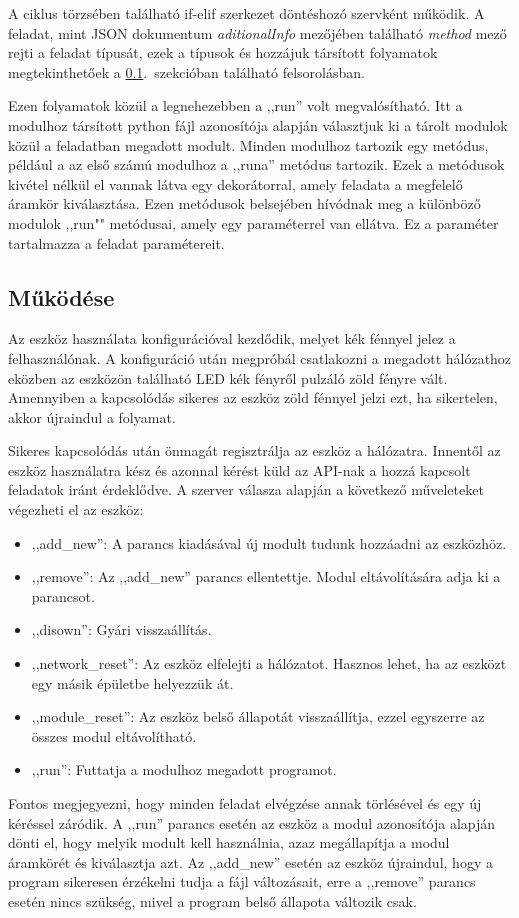 \documentclass{thesis-ekf}
\theoremstyle{definition}
\theoremstyle{remark}
\begin{document}
	 A ciklus törzsében található if-elif szerkezet döntéshozó szervként működik. A feladat, mint JSON dokumentum \textit{aditionalInfo} mezőjében található \textit{method} mező rejti a feladat típusát, ezek a típusok és hozzájuk társított folyamatok megtekinthetőek a \ref{ssec_mukodes}.~szekcióban található felsorolásban.
	 
	 Ezen folyamatok közül a legnehezebben a ,,run'' volt megvalósítható. Itt a modulhoz társított python fájl azonosítója alapján választjuk ki a tárolt modulok közül a feladatban megadott modult. Minden modulhoz tartozik egy metódus, például a az első számú modulhoz a ,,runa'' metódus tartozik. Ezek a metódusok kivétel nélkül el vannak látva egy dekorátorral, amely feladata a megfelelő áramkör kiválasztása. Ezen metódusok belsejében hívódnak meg a különböző modulok ,,run"" metódusai, amely egy paraméterrel van ellátva. Ez a paraméter tartalmazza a feladat paramétereit.
	 
	 
	 
	 \subsection{Működése}
	 \label{ssec_mukodes}
	 Az eszköz használata konfigurációval kezdődik, melyet kék fénnyel jelez a felhasználónak. A konfiguráció után megpróbál csatlakozni a megadott hálózathoz eközben az eszközön található LED kék fényről pulzáló zöld fényre vált. Amennyiben a kapcsolódás sikeres az eszköz zöld fénnyel jelzi ezt, ha sikertelen, akkor újraindul a folyamat.
	 
	 Sikeres kapcsolódás után önmagát regisztrálja az eszköz a hálózatra. Innentől az eszköz használatra kész és azonnal kérést küld az API-nak a hozzá kapcsolt feladatok iránt érdeklődve. A szerver válasza alapján a következő műveleteket végezheti el az eszköz:
	 \begin{itemize}
	 	
	 	\item ,,add\_new'': A parancs kiadásával új modult tudunk hozzáadni az eszközhöz.
	 	\item ,,remove'': Az ,,add\_new'' parancs ellentettje. Modul eltávolítására adja ki a parancsot.
	 	\item ,,disown'': Gyári visszaállítás.
	 	\item ,,network\_reset'': Az eszköz elfelejti a hálózatot. Hasznos lehet, ha az eszközt egy másik épületbe helyezzük át.
	 	\item ,,module\_reset'': Az eszköz belső állapotát visszaállítja, ezzel egyszerre az összes modul eltávolítható.
	 	\item ,,run'': Futtatja a modulhoz megadott programot.
	 \end{itemize}
	 Fontos megjegyezni, hogy minden feladat elvégzése annak törlésével és egy új kéréssel záródik. A ,,run'' parancs esetén az eszköz a modul azonosítója alapján dönti el, hogy melyik modult kell használnia, azaz megállapítja a modul áramkörét és kiválasztja azt. Az ,,add\_new'' esetén az eszköz újraindul, hogy a program sikeresen érzékelni tudja a fájl változásait, erre a ,,remove'' parancs esetén nincs szükség, mivel a program belső állapota változik csak.
	 
\end{document}
